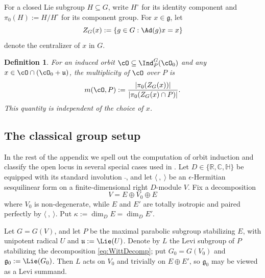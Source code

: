 \documentclass[11pt,a4paper]{amsart}
\numberwithin{equation}{section}
\newtheorem{defn}[thm]{Definition}
\theoremstyle{remark}
\begin{document}
For a closed Lie subgroup $H\subseteq G$, write $H^\circ$ for its identity component and $\pi_0(H):=H/H^\circ$ for its component group. For $x\in\mathfrak g$, let
\[
Z_G(x):=\{g\in G:\Ad(g)x=x\}
\]
denote the centralizer of $x$ in $G$.

\begin{defn}\label{def:mult}
For an induced orbit $\cO\subseteq\Ind_P^G(\cO_0)$ and any $x\in\cO\cap(\cO_0+\mathfrak u)$, the \emph{multiplicity} of $\cO$ over $P$ is
\[
m(\cO,P) := \frac{|\pi_0(Z_G(x))|}{|\pi_0(Z_G(x)\cap P)|}.
\]
This quantity is independent of the choice of $x$.
\end{defn}

\subsection{The classical group setup}

In the rest of the appendix we spell out the computation of orbit induction and classify the open locus in several special cases used in .  Let $D\in\{\mathbb R,\mathbb C,\mathbb H\}$
be equipped with its standard involution $\bar{\ }$, and let $\langle\ ,\ \rangle$ be an $\epsilon$-Hermitian sesquilinear form on a finite-dimensional right $D$-module $V$.  Fix a decomposition
\begin{equation}\label{eq:WittDecomp}
V=E\oplus V_0\oplus E
\end{equation}
where $V_0$ is non-degenerate, while $E$ and $E'$ are totally isotropic and paired perfectly by $\langle\ ,\ \rangle$.  Put $\kappa:=\dim_D E=\dim_D E'$.

Let $G=G(V)$, and let $P$ be the maximal parabolic subgroup stabilizing $E$, with unipotent radical $U$ and $\mathfrak u:=\Lie(U)$.  Denote by $L$ the Levi subgroup of $P$ stabilizing the decomposition \eqref{eq:WittDecomp}; put $G_0=G(V_0)$ and $\mathfrak g_0:=\Lie(G_0)$.  Then $L$ acts on $V_0$ and trivially on $E\oplus E'$, so $\mathfrak g_0$ may be viewed as a Levi summand.
\end{document}
